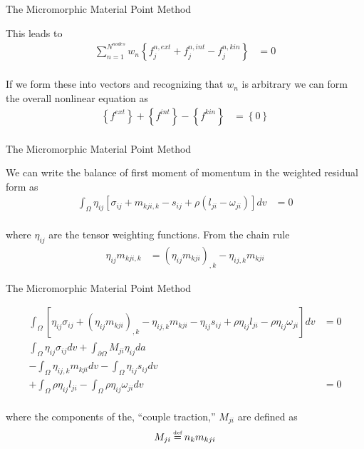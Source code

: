 \documentclass[11pt]{beamer}
\newcommand\defeq{\mathrel{\stackrel{\makebox[0pt]{\mbox{\normalfont\tiny def}}}{=}}}
\begin{document}
\begin{frame}{The Micromorphic Material Point Method}

This leads to
\begin{align*}
\sum_{n=1}^{N^{nodes}} w_n \left\{f_j^{n,ext} + f_j^{n,int} - f_j^{n,kin}\right\} &= 0\\
\end{align*}

If we form these into vectors and recognizing that $w_n$ is arbitrary we can form the overall nonlinear equation as
\begin{align*}
\left\{f^{ext}\right\} + \left\{f^{int}\right\} - \left\{f^{kin}\right\} &= \left\{0\right\}\\
\end{align*}

\end{frame}

\begin{frame}{The Micromorphic Material Point Method}

We can write the balance of first moment of momentum in the weighted residual form as
\begin{align*}
\int_{\Omega} \eta_{ij} \left[\sigma_{ij} + m_{kji,k} - s_{ij} + \rho\left(l_{ji} - \omega_{ji}\right) \right] dv&= 0\\
\end{align*}

where $\eta_{ij}$ are the tensor weighting functions. From the chain rule
\begin{align*}
\eta_{ij} m_{kji,k} &= \left(\eta_{ij} m_{kji}\right)_{,k} - \eta_{ij,k} m_{kji}
\end{align*}

\end{frame}

\begin{frame}{The Micromorphic Material Point Method}

\begin{align*}
\int_{\Omega} \left[\eta_{ij} \sigma_{ij} + \left(\eta_{ij} m_{kji}\right)_{,k} - \eta_{ij,k} m_{kji} - \eta_{ij} s_{ij} + \rho \eta_{ij} l_{ji} - \rho \eta_{ij} \omega_{ji} \right] dv&= 0\\
\int_{\Omega} \eta_{ij} \sigma_{ij} dv + \int_{\partial \Omega} M_{ji} \eta_{ij} da&\\
- \int_{\Omega} \eta_{ij,k} m_{kji}dv - \int_{\Omega} \eta_{ij} s_{ij}dv&\\
 + \int_{\Omega} \rho \eta_{ij} l_{ji} - \int_{\Omega} \rho \eta_{ij} \omega_{ji} dv&= 0\\
\end{align*}

where the components of the, ``couple traction,'' $M_{ji}$ are defined as
\begin{align*}
M_{ji} &\defeq n_k m_{kji}\\
\end{align*}

\end{frame}
\end{document}
